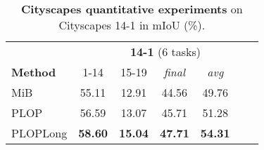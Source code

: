 \begin{table}[t]
    \centering
    \begin{tabular}{@{}l|cc|cccc@{}}
        \toprule
                                                                   & \multicolumn{6}{c}{\textbf{14-1} (6 tasks)}                                                    \\
        \textbf{Method}                                            & 1-14                                        & 15-19          & \textit{final} & \textit{avg}   \\
        \midrule
        MiB \scriptsize{\citep{cermelli2020modelingthebackground}} & 55.11                                       & 12.91          & 44.56          & 49.76          \\
        PLOP                                                       & 56.59                                       & 13.07          & 45.71          & 51.28          \\
        PLOPLong                                                   & \textbf{58.60}                              & \textbf{15.04} & \textbf{47.71} & \textbf{54.31} \\
        \bottomrule
    \end{tabular}
    \caption{\textbf{Cityscapes quantitative experiments} on Cityscapes 14-1 in \ac{mIoU} (\%).}
    \label{tab:seg_cityscapes_class}
\end{table}
